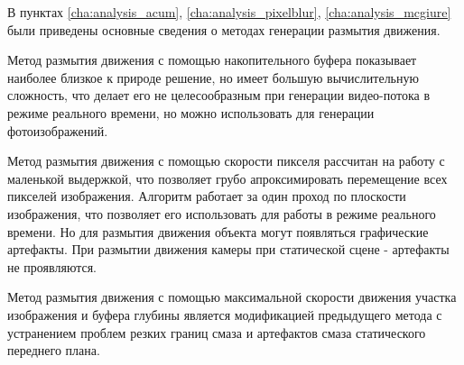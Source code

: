 В пунктах \ref{cha:analysis_acum}, \ref{cha:analysis_pixelblur}, \ref{cha:analysis_mcgiure} были приведены основные сведения о методах генерации размытия движения.
\par

Метод размытия движения с помощью накопительного буфера показывает наиболее близкое к природе решение, но имеет большую вычислительную сложность, что делает его не целесообразным при генерации видео-потока в режиме реального времени, но можно использовать для генерации фотоизображений.
\par
Метод размытия движения с помощью скорости пикселя рассчитан на работу с маленькой выдержкой, что позволяет грубо апроксимировать перемещение всех пикселей изображения. Алгоритм работает за один проход по плоскости изображения, что позволяет его использовать для работы в режиме реального времени. Но для размытия движения объекта могут появляться графические артефакты. При размытии движения камеры при статической сцене - артефакты не проявляются.
\par
Метод размытия движения с помощью максимальной скорости движения участка изображения и буфера глубины является модификацией предыдущего метода с устранением проблем резких границ смаза и артефактов смаза статического переднего плана.

